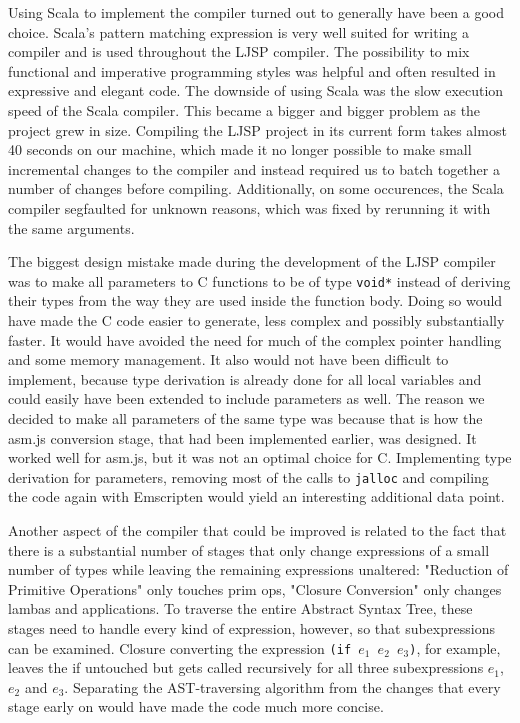 \documentclass[11pt]{report}
\begin{document}
Using Scala to implement the compiler turned out to generally have been a good choice. Scala's pattern matching expression is very well suited for writing a compiler and is used throughout the LJSP compiler. The possibility to mix functional and imperative programming styles was helpful and often resulted in expressive and elegant code. The downside of using Scala was the slow execution speed of the Scala compiler. This became a bigger and bigger problem as the project grew in size. Compiling the LJSP project in its current form takes almost 40 seconds on our machine, which made it no longer possible to make small incremental changes to the compiler and instead required us to batch together a number of changes before compiling. Additionally, on some occurences, the Scala compiler segfaulted for unknown reasons, which was fixed by rerunning it with the same arguments.

The biggest design mistake made during the development of the LJSP compiler was to make all parameters to C functions to be of type \texttt{void*} instead of deriving their types from the way they are used inside the function body. Doing so would have made the C code easier to generate, less complex and possibly substantially faster. It would have avoided the need for much of the complex pointer handling and some memory management. It also would not have been difficult to implement, because type derivation is already done for all local variables and could easily have been extended to include parameters as well. The reason we decided to make all parameters of the same type was because that is how the asm.js conversion stage, that had been implemented earlier, was designed. It worked well for asm.js, but it was not an optimal choice for C. Implementing type derivation for parameters, removing most of the calls to \texttt{jalloc} and compiling the code again with Emscripten would yield an interesting additional data point.

Another aspect of the compiler that could be improved is related to the fact that there is a substantial number of stages that only change expressions of a small number of types while leaving the remaining expressions unaltered: "Reduction of Primitive Operations" only touches prim ops, "Closure Conversion" only changes lambas and applications. To traverse the entire Abstract Syntax Tree, these stages need to handle every kind of expression, however, so that subexpressions can be examined. Closure converting the expression \texttt{(if $e_1$ $e_2$ $e_3$)}, for example, leaves the if untouched but gets called recursively for all three subexpressions $e_1$, $e_2$ and $e_3$. Separating the AST-traversing algorithm from the changes that every stage early on would have made the code much more concise.
\end{document}
